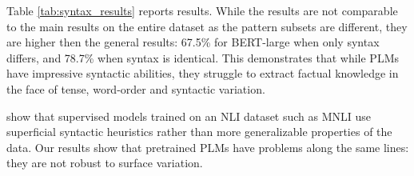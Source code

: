 Table \ref{tab:syntax_results}
reports results.
While the results are not comparable to the main results on
the entire dataset as the pattern subsets are different,
they are higher then the general results: 67.5\% for BERT-large when only 
syntax differs, and 78.7\% when syntax is
identical. This demonstrates that while PLMs have impressive syntactic abilities, 
they struggle to extract factual knowledge in the face of
tense, word-order and syntactic variation.


\citet{mccoy2019right}  show that supervised models trained on an NLI
dataset \cite{dagan-rte,snli} such as MNLI \cite{mnli} use
superficial syntactic heuristics rather than more
generalizable properties of the data.
Our results show that pretrained PLMs have  problems along
the same lines:
they are not robust to surface variation.


